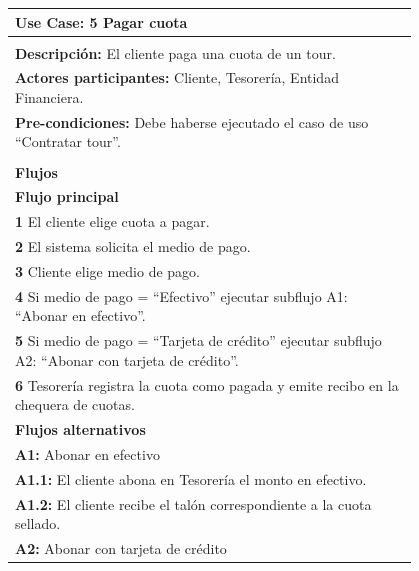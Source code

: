 \documentclass[12pt,a4paper,titlepage,oneside]{article}
\begin{document}
\begin{tabular}{| l | p{0.8\linewidth} |} \hline
	\multicolumn{2}{|p{0.8\linewidth}|}{\textbf{Use Case:} 5 Pagar cuota} \\ \hline
	\multicolumn{2}{|c|}{} \\ \hline
	\multicolumn{2}{|p{0.8\linewidth}|}{\textbf{Descripci\'on:} El cliente paga una cuota de un tour.} \\ \hline
	\multicolumn{2}{|p{0.8\linewidth}|}{\textbf{Actores participantes:} Cliente, Tesorería, Entidad Financiera.} \\ \hline
	\multicolumn{2}{|p{0.8\linewidth}|}{\textbf{Pre-condiciones:} Debe haberse ejecutado el caso de uso “Contratar tour”.} \\ \hline
	\multicolumn{2}{|c|}{} \\ \hline
	\multicolumn{2}{|p{0.8\linewidth}|}{\textbf{Flujos}} \\ \hline
	\multicolumn{2}{|p{0.8\linewidth}|}{\textbf{Flujo principal}} \\ \hline
	\multicolumn{2}{|p{0.8\linewidth}|}{\textbf{1} El cliente elige cuota a pagar.} \\ \hline
	\multicolumn{2}{|p{0.8\linewidth}|}{\textbf{2} El sistema solicita el medio de pago.} \\ \hline
	\multicolumn{2}{|p{0.8\linewidth}|}{\textbf{3} Cliente elige medio de pago.} \\ \hline
	\multicolumn{2}{|p{0.8\linewidth}|}{\textbf{4} Si medio de pago = “Efectivo” ejecutar subflujo A1: “Abonar en efectivo”.} \\ \hline
		\multicolumn{2}{|p{0.8\linewidth}|}{\textbf{5} Si medio de pago = “Tarjeta de crédito” ejecutar subflujo A2: “Abonar con tarjeta de crédito”.} \\ \hline
			\multicolumn{2}{|p{0.8\linewidth}|}{\textbf{6} Tesorería registra la cuota como pagada y emite recibo en la chequera de cuotas.} \\ \hline
			\multicolumn{2}{|p{0.8\linewidth}|}{\textbf{Flujos alternativos}	}\\ 			     \hline
	\multicolumn{2}{|p{0.8\linewidth}|}{\textbf{A1:} Abonar en efectivo} \\ \hline
	\multicolumn{2}{|p{0.8\linewidth}|}{\textbf{A1.1:} El cliente abona en Tesorería el monto en efectivo.} \\ \hline
	\multicolumn{2}{|p{0.8\linewidth}|}{\textbf{A1.2:} El cliente recibe el talón correspondiente a la cuota sellado.} \\ \hline
		\multicolumn{2}{|p{0.8\linewidth}|}{\textbf{A2:} Abonar con tarjeta de crédito} \\ \hline

\end{tabular}
\end{document}
